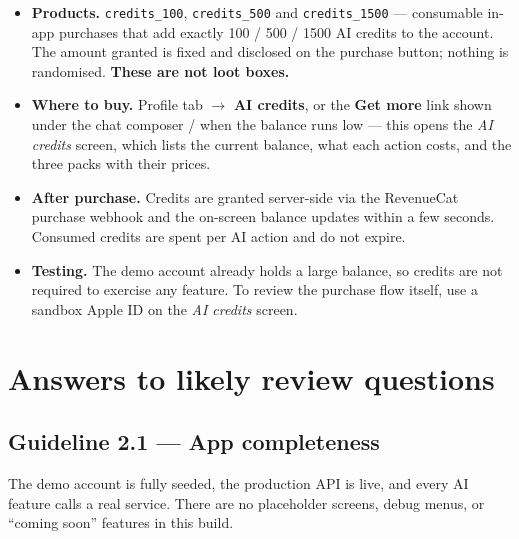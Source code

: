 \documentclass[11pt]{article}
\begin{document}
\begin{itemize}
  \item \textbf{Products.} \texttt{credits\_100}, \texttt{credits\_500} and
        \texttt{credits\_1500} --- consumable in-app purchases that add exactly 100 / 500 /
        1500 AI credits to the account. The amount granted is fixed and disclosed on the
        purchase button; nothing is randomised. \textbf{These are not loot boxes.}
  \item \textbf{Where to buy.} Profile tab $\rightarrow$ \textbf{AI credits}, or the
        \textbf{Get more} link shown under the chat composer / when the balance runs low ---
        this opens the \emph{AI credits} screen, which lists the current balance, what each
        action costs, and the three packs with their prices.
  \item \textbf{After purchase.} Credits are granted server-side via the RevenueCat purchase
        webhook and the on-screen balance updates within a few seconds. Consumed credits are
        spent per AI action and do not expire.
  \item \textbf{Testing.} The demo account already holds a large balance, so credits are not
        required to exercise any feature. To review the purchase flow itself, use a sandbox
        Apple ID on the \emph{AI credits} screen.
\end{itemize}

\section{Answers to likely review questions}

\subsection{Guideline 2.1 --- App completeness}
The demo account is fully seeded, the production API is live, and every AI feature calls a
real service. There are no placeholder screens, debug menus, or ``coming soon'' features in
this build.
\end{document}
